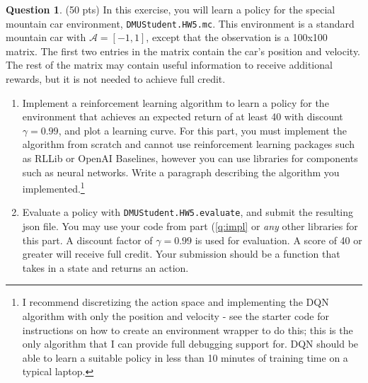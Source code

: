 \documentclass{article}
\theoremstyle{definition}
\newtheorem{question}[thm]{Question}
\begin{document}
\begin{question}
    (50 pts) In this exercise, you will learn a policy for the special mountain car environment, \texttt{DMUStudent.HW5.mc}. This environment is a standard mountain car with $\mathcal{A}=[-1, 1]$, except that the observation is a 100x100 matrix. The first two entries in the matrix contain the car's position and velocity. The rest of the matrix may contain useful information to receive additional rewards, but it is not needed to achieve full credit.
    \begin{enumerate}[label=\alph*)]
        \item Implement a reinforcement learning algorithm to learn a policy for the environment that achieves an expected return of at least 40 with discount $\gamma=0.99$, and plot a learning curve. For this part, you must implement the algorithm from scratch and cannot use reinforcement learning packages such as RLLib or OpenAI Baselines, however you can use libraries for components such as neural networks. Write a paragraph describing the algorithm you implemented.\footnote{I recommend discretizing the action space and implementing the DQN algorithm with only the position and velocity - see the starter code for instructions on how to create an environment wrapper to do this; this is the only algorithm that I can provide full debugging support for. DQN should be able to learn a suitable policy in less than 10 minutes of training time on a typical laptop.}\label{q:impl}
        \item Evaluate a policy with \texttt{DMUStudent.HW5.evaluate}, and submit the resulting json file. You may use your code from part (\ref{q:impl} or \emph{any} other libraries for this part. A discount factor of $\gamma=0.99$ is used for evaluation. A score of 40 or greater will receive full credit. Your submission should be a function that takes in a state and returns an action.
    \end{enumerate}
\end{question}
\end{document}
